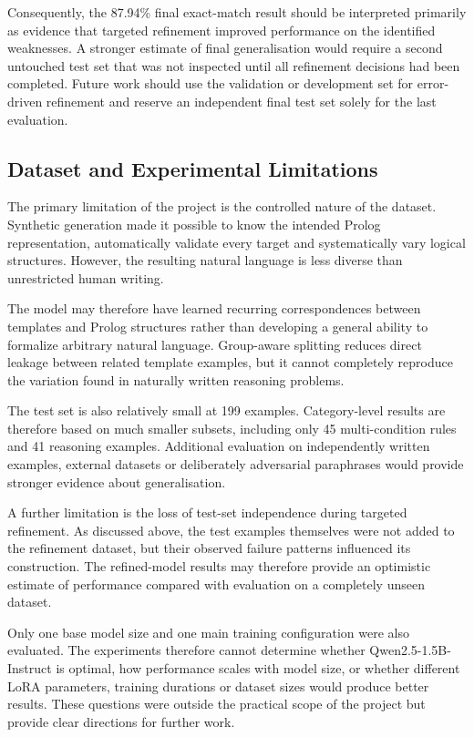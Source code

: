 \documentclass[11pt]{article} %
\theoremstyle{plain}
\theoremstyle{definition}
\begin{document}
Consequently, the 87.94\% final exact-match result should be interpreted
primarily as evidence that targeted refinement improved performance on the
identified weaknesses. A stronger estimate of final generalisation would
require a second untouched test set that was not inspected until all refinement
decisions had been completed. Future work should use the validation or
development set for error-driven refinement and reserve an independent final
test set solely for the last evaluation.


\subsection{Dataset and Experimental Limitations}

The primary limitation of the project is the controlled nature of the dataset.
Synthetic generation made it possible to know the intended Prolog
representation, automatically validate every target and systematically vary
logical structures. However, the resulting natural language is less diverse
than unrestricted human writing.

The model may therefore have learned recurring correspondences between
templates and Prolog structures rather than developing a general ability to
formalize arbitrary natural language. Group-aware splitting reduces direct
leakage between related template examples, but it cannot completely reproduce
the variation found in naturally written reasoning problems.

The test set is also relatively small at 199 examples. Category-level results
are therefore based on much smaller subsets, including only 45 multi-condition
rules and 41 reasoning examples. Additional evaluation on independently
written examples, external datasets or deliberately adversarial paraphrases
would provide stronger evidence about generalisation.

A further limitation is the loss of test-set independence during targeted refinement.
As discussed above, the test examples themselves were not added to the
refinement dataset, but their observed failure patterns influenced its construction.
The refined-model results may therefore provide an optimistic estimate of
performance compared with evaluation on a completely unseen dataset.

Only one base model size and one main training configuration were also
evaluated. The experiments therefore cannot determine whether
Qwen2.5-1.5B-Instruct is optimal, how performance scales with model size, or
whether different LoRA parameters, training durations or dataset sizes would
produce better results. These questions were outside the practical scope of
the project but provide clear directions for further work.
\end{document}

